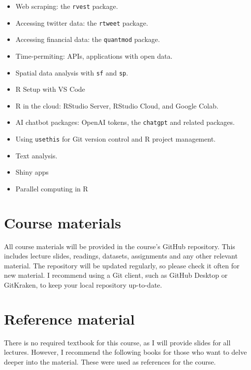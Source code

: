 \documentclass[
  letterpaper,
  DIV=11,
  numbers=noendperiod]{scrartcl}
\providecommand{\tightlist}{%
  \setlength{\itemsep}{0pt}\setlength{\parskip}{0pt}}\usepackage{longtable,booktabs,array}
\begin{document}
\begin{itemize}
  \begin{itemize}
  \tightlist
  \item
    Web scraping: the \texttt{rvest} package.
  \item
    Accessing twitter data: the \texttt{rtweet} package.
  \item
    Accessing financial data: the \texttt{quantmod} package.
  \item
    Time-permiting: APIs, applications with open data.
  \item
    Spatial data analysis with \texttt{sf} and \texttt{sp}.
  \item
    R Setup with VS Code
  \item
    R in the cloud: RStudio Server, RStudio Cloud, and Google Colab.
  \item
    AI chatbot packages: OpenAI tokens, the \texttt{chatgpt} and related
    packages.
  \item
    Using \texttt{usethis} for Git version control and R project
    management.
  \item
    Text analysis.
  \item
    Shiny apps
  \item
    Parallel computing in R
  \end{itemize}
\end{itemize}

\section{Course materials}\label{course-materials}

All course materials will be provided in the course's GitHub repository.
This includes lecture slides, readings, datasets, assignments and any
other relevant material. The repository will be updated regularly, so
please check it often for new material. I recommend using a Git client,
such as GitHub Desktop or GitKraken, to keep your local repository
up-to-date.

\section{Reference material}\label{reference-material}

There is no required textbook for this course, as I will provide slides
for all lectures. However, I recommend the following books for those who
want to delve deeper into the material. These were used as references
for the course.
\end{document}
